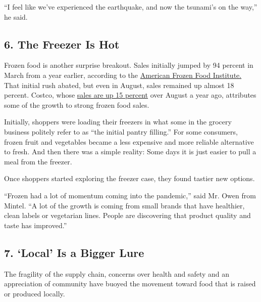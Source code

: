 ``I feel like we've experienced the earthquake, and now the tsunami's on
the way,'' he said.

\hypertarget{6-the-freezer-is-hot}{%
\subsection{6. The Freezer Is Hot}\label{6-the-freezer-is-hot}}

Frozen food is another surprise breakout. Sales initially jumped by 94
percent in March from a year earlier, according to the
\href{https://affi.org/wp-content/uploads/2020/documents/Frozen\%20Food\%20Sales\%20Amid\%20COVID-19\%20Consumer\%20Research\%20-\%20FINAL.pdf}{American
Frozen Food Institute.} That initial rush abated, but even in August,
sales remained up almost 18 percent. Costco, whose
\href{https://www.supermarketnews.com/retail-financial/costco-reports-double-digit-sales-growth-august-q4?NL=SN-02\&Issue=SN-02_20200908_SN-02_551\&sfvc4enews=42\&cl=article_1\&utm_rid=CPG06000000192089\&utm_campaign=40944\&utm_medium=email\&elq2=f95a1058afc044959b8fedcc7da0433e}{sales
are up 15 percent} over August a year ago, attributes some of the growth
to strong frozen food sales.

Initially, shoppers were loading their freezers in what some in the
grocery business politely refer to as ``the initial pantry filling.''
For some consumers, frozen fruit and vegetables became a less expensive
and more reliable alternative to fresh. And then there was a simple
reality: Some days it is just easier to pull a meal from the freezer.

Once shoppers started exploring the freezer case, they found tastier new
options.

``Frozen had a lot of momentum coming into the pandemic,'' said Mr. Owen
from Mintel. ``A lot of the growth is coming from small brands that have
healthier, clean labels or vegetarian lines. People are discovering that
product quality and taste has improved.''

\hypertarget{7-local-is-a-bigger-lure}{%
\subsection{7. `Local' Is a Bigger
Lure}\label{7-local-is-a-bigger-lure}}

The fragility of the supply chain, concerns over health and safety and
an appreciation of community have buoyed the movement toward food that
is raised or produced locally.

